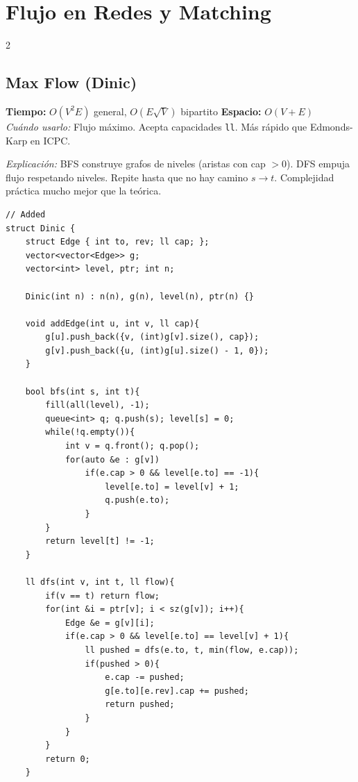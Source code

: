 \documentclass[10pt,a4paper]{article}
\begin{document}
\section{Flujo en Redes y Matching}
\begin{multicols}{2}

\subsection{Max Flow (Dinic)}
\textbf{Tiempo:} $O(V^2 E)$ general, $O(E\sqrt{V})$ bipartito \quad \textbf{Espacio:} $O(V + E)$\\
\textit{Cu\'ando usarlo:} Flujo m\'aximo. Acepta capacidades \texttt{ll}. M\'as r\'apido que Edmonds-Karp en ICPC.

\textit{Explicaci\'on:} BFS construye grafos de niveles (aristas con cap $>0$). DFS empuja flujo respetando niveles. Repite hasta que no hay camino $s \to t$. Complejidad pr\'actica mucho mejor que la te\'orica.

\begin{lstlisting}
// Added
struct Dinic {
    struct Edge { int to, rev; ll cap; };
    vector<vector<Edge>> g;
    vector<int> level, ptr; int n;

    Dinic(int n) : n(n), g(n), level(n), ptr(n) {}

    void addEdge(int u, int v, ll cap){
        g[u].push_back({v, (int)g[v].size(), cap});
        g[v].push_back({u, (int)g[u].size() - 1, 0});
    }

    bool bfs(int s, int t){
        fill(all(level), -1);
        queue<int> q; q.push(s); level[s] = 0;
        while(!q.empty()){
            int v = q.front(); q.pop();
            for(auto &e : g[v])
                if(e.cap > 0 && level[e.to] == -1){
                    level[e.to] = level[v] + 1;
                    q.push(e.to);
                }
        }
        return level[t] != -1;
    }

    ll dfs(int v, int t, ll flow){
        if(v == t) return flow;
        for(int &i = ptr[v]; i < sz(g[v]); i++){
            Edge &e = g[v][i];
            if(e.cap > 0 && level[e.to] == level[v] + 1){
                ll pushed = dfs(e.to, t, min(flow, e.cap));
                if(pushed > 0){
                    e.cap -= pushed;
                    g[e.to][e.rev].cap += pushed;
                    return pushed;
                }
            }
        }
        return 0;
    }


\end{lstlisting}
\end{multicols}
\end{document}
